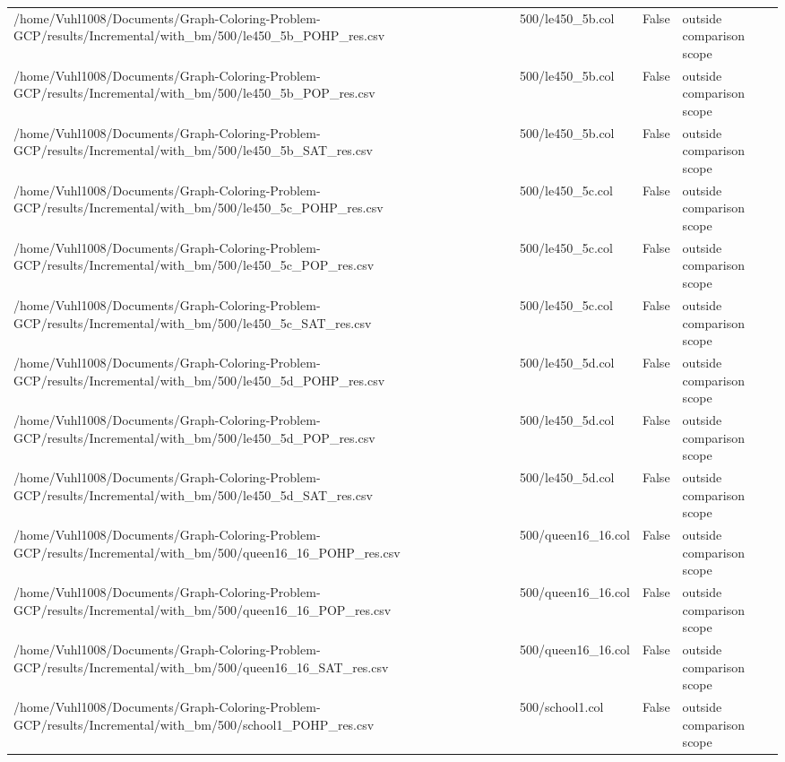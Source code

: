 \begin{table}[htbp]
\begin{tabular}{llll}
/home/Vuhl1008/Documents/Graph-Coloring-Problem-GCP/results/Incremental/with\_bm/500/le450\_5b\_POHP\_res.csv & 500/le450\_5b.col & False & outside comparison scope \\
/home/Vuhl1008/Documents/Graph-Coloring-Problem-GCP/results/Incremental/with\_bm/500/le450\_5b\_POP\_res.csv & 500/le450\_5b.col & False & outside comparison scope \\
/home/Vuhl1008/Documents/Graph-Coloring-Problem-GCP/results/Incremental/with\_bm/500/le450\_5b\_SAT\_res.csv & 500/le450\_5b.col & False & outside comparison scope \\
/home/Vuhl1008/Documents/Graph-Coloring-Problem-GCP/results/Incremental/with\_bm/500/le450\_5c\_POHP\_res.csv & 500/le450\_5c.col & False & outside comparison scope \\
/home/Vuhl1008/Documents/Graph-Coloring-Problem-GCP/results/Incremental/with\_bm/500/le450\_5c\_POP\_res.csv & 500/le450\_5c.col & False & outside comparison scope \\
/home/Vuhl1008/Documents/Graph-Coloring-Problem-GCP/results/Incremental/with\_bm/500/le450\_5c\_SAT\_res.csv & 500/le450\_5c.col & False & outside comparison scope \\
/home/Vuhl1008/Documents/Graph-Coloring-Problem-GCP/results/Incremental/with\_bm/500/le450\_5d\_POHP\_res.csv & 500/le450\_5d.col & False & outside comparison scope \\
/home/Vuhl1008/Documents/Graph-Coloring-Problem-GCP/results/Incremental/with\_bm/500/le450\_5d\_POP\_res.csv & 500/le450\_5d.col & False & outside comparison scope \\
/home/Vuhl1008/Documents/Graph-Coloring-Problem-GCP/results/Incremental/with\_bm/500/le450\_5d\_SAT\_res.csv & 500/le450\_5d.col & False & outside comparison scope \\
/home/Vuhl1008/Documents/Graph-Coloring-Problem-GCP/results/Incremental/with\_bm/500/queen16\_16\_POHP\_res.csv & 500/queen16\_16.col & False & outside comparison scope \\
/home/Vuhl1008/Documents/Graph-Coloring-Problem-GCP/results/Incremental/with\_bm/500/queen16\_16\_POP\_res.csv & 500/queen16\_16.col & False & outside comparison scope \\
/home/Vuhl1008/Documents/Graph-Coloring-Problem-GCP/results/Incremental/with\_bm/500/queen16\_16\_SAT\_res.csv & 500/queen16\_16.col & False & outside comparison scope \\
/home/Vuhl1008/Documents/Graph-Coloring-Problem-GCP/results/Incremental/with\_bm/500/school1\_POHP\_res.csv & 500/school1.col & False & outside comparison scope \\

\end{tabular}
\end{table}
